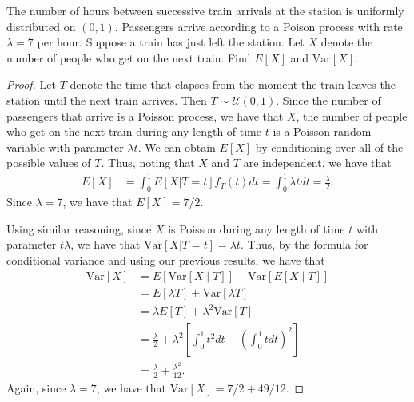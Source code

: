 \begin{problem}{5.50}
  The number of hours between successive train arrivals at the station is uniformly
  distributed on $(0, 1)$. Passengers arrive according to a Poison process
  with rate $\lambda = 7$ per hour. Suppose a train has just left the station. Let $X$ denote
  the number of people who get on the next train. Find $E[X]$ and $\text{Var}[X]$.
\end{problem}

\begin{proof}
  Let $T$ denote the time that elapses from the moment the train leaves the station
  until the next train arrives. Then $T\sim \mathcal{U}(0, 1)$. Since the number of passengers that arrive is a
  Poisson process, we have that $X$, the number of people who get on the next train
  during any length of time $t$ is a Poisson random variable with parameter $\lambda t$.
  We can obtain $E[X]$ by conditioning over all of the possible values of $T$.
  Thus, noting that $X$ and $T$ are independent, we have that
  \begin{align*}
    E[X] &= \int_0^1 E[X|T=t] f_T(t) dt = \int_0^1 \lambda t dt = \frac{\lambda}{2}.
  \end{align*}
  Since $\lambda = 7$, we have that $E[X] = 7/2$.

  Using similar reasoning, since $X$ is Poisson during any length of time $t$
  with parameter $t\lambda$, we have that $\text{Var}[X | T = t] = \lambda t $.
  Thus, by the formula for conditional variance and using our previous results, we have that
  \begin{align*}
    \text{Var}[X]
    &= E\left[\text{Var}[X \mid T]\right] + \text{Var}\left[E[X \mid T]\right] \\
    &= E\left[\lambda T\right] + \text{Var}\left[ \lambda T \right] \\
    &= \lambda E[T] + \lambda^2\text{Var}[T] \\
    &= \frac{\lambda}{2} + \lambda^2\left[\int_0^1 t^2 dt - \left(\int_0^1 t dt\right)^2\right] \\
    &= \frac{\lambda}{2} + \frac{\lambda^2}{12}.
  \end{align*}
  Again, since $\lambda = 7$, we have that $\text{Var}[X] = 7/2 + 49/12$.
\end{proof}
\newpage
